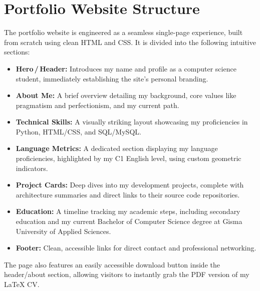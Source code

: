 \documentclass[12pt, a4paper]{report}
\begin{document}
\chapter{Portfolio Website Structure}

The portfolio website is engineered as a seamless single-page experience,
built from scratch using clean HTML and CSS. It is divided into the
following intuitive sections:

\begin{itemize}
  \item \textbf{Hero\,/\,Header:} Introduces my name and profile as a
        computer science student, immediately establishing the site's
        personal branding.

  \item \textbf{About Me:} A brief overview detailing my background, core
        values like pragmatism and perfectionism, and my current path.

  \item \textbf{Technical Skills:} A visually striking layout showcasing my
        proficiencies in Python, HTML/CSS, and SQL/MySQL.

  \item \textbf{Language Metrics:} A dedicated section displaying my language
        proficiencies, highlighted by my C1 English level, using custom
        geometric indicators.

  \item \textbf{Project Cards:} Deep dives into my development projects,
        complete with architecture summaries and direct links to their source
        code repositories.

  \item \textbf{Education:} A timeline tracking my academic steps, including
        secondary education and my current Bachelor of Computer Science degree
        at Gisma University of Applied Sciences.

  \item \textbf{Footer:} Clean, accessible links for direct contact and
        professional networking.
\end{itemize}

The page also features an easily accessible download button inside the
header/about section, allowing visitors to instantly grab the PDF version of
my LaTeX CV.
\end{document}
